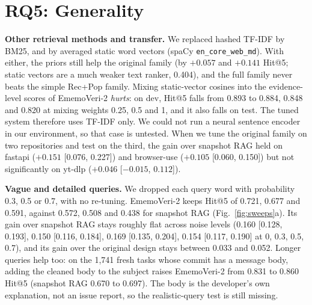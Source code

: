 \documentclass[runningheads]{llncs}
\newcommand{\sys}{EmemoVeri}
\begin{document}
\begin{table}[t]\centering\footnotesize\setlength{\tabcolsep}{4pt}
\resizebox{\linewidth}{!}{}
\caption{Component analysis of the frozen \sys{}-2 on new data: Hit@5 lost when one ingredient is removed (full minus variant; positive means the ingredient helps). Unit: repository; Holm correction over the eight rows. Rename carry-over needs a separate replay and was run on the fresh set only.}
\label{tab:component}
\end{table}

\section{RQ5: Generality}
\label{sec:general}
\textbf{Other retrieval methods and transfer.} We replaced hashed TF-IDF by BM25, and by averaged static word vectors (spaCy \texttt{en\_core\_web\_md}). With either, the priors still help the original family (by $+0.057$ and $+0.141$ Hit@5; static vectors are a much weaker text ranker, 0.404), and the full family never beats the simple Rec+Pop family. Mixing static-vector cosines into the evidence-level scores of \sys{}-2 \emph{hurts}: on dev, Hit@5 falls from 0.893 to 0.884, 0.848 and 0.820 at mixing weights 0.25, 0.5 and 1, and it also falls on test. The tuned system therefore uses TF-IDF only. We could not run a neural sentence encoder in our environment, so that case is untested. When we tune the original family on two repositories and test on the third, the gain over snapshot RAG held on fastapi ($+0.151$ [0.076, 0.227]) and browser-use ($+0.105$ [0.060, 0.150]) but not significantly on yt-dlp ($+0.046$ [$-0.015$, $0.112$]).

\textbf{Vague and detailed queries.} We dropped each query word with probability 0.3, 0.5 or 0.7, with no re-tuning. \sys{}-2 keeps Hit@5 of 0.721, 0.677 and 0.591, against 0.572, 0.508 and 0.438 for snapshot RAG (Fig.~\ref{fig:sweeps}a). Its gain over snapshot RAG stays roughly flat across noise levels (0.160 [0.128, 0.193], 0.150 [0.116, 0.184], 0.169 [0.135, 0.204], 0.154 [0.117, 0.190] at 0, 0.3, 0.5, 0.7), and its gain over the original design stays between 0.033 and 0.052. Longer queries help too: on the 1{,}741 fresh tasks whose commit has a message body, adding the cleaned body to the subject raises \sys{}-2 from 0.831 to 0.860 Hit@5 (snapshot RAG 0.670 to 0.697). The body is the developer's own explanation, not an issue report, so the realistic-query test is still missing.
\end{document}
